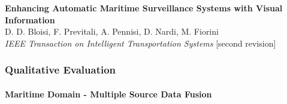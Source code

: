 \begin{frame}
	\vspace{-0.04cm}
	
	\tiny
	
	\textbf{Enhancing Automatic Maritime Surveillance Systems with Visual Information} \\
	D. D. Bloisi, F. Previtali, A. Pennisi, D. Nardi, M. Fiorini \\
	\emph{IEEE Transaction on Intelligent Transportation Systems} [second revision] \\
\end{frame}

\begin{frame}
	\frametitle{Qualitative Evaluation}
	\framesubtitle{Maritime Domain - Multiple Source Data Fusion}
	
	\begin{figure}[!h]
		\centering
	\end{figure}
\end{frame}

